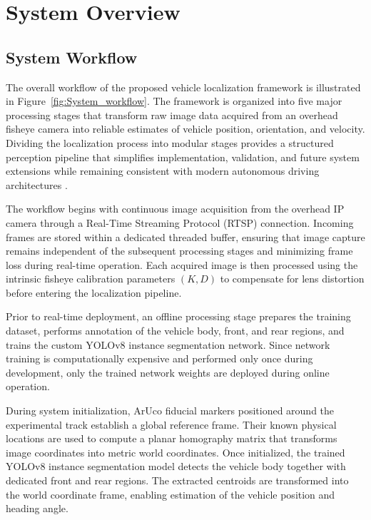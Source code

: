 \chapter{System Overview}

\section{System Workflow}

The overall workflow of the proposed vehicle localization framework is illustrated in Figure~\ref{fig:System_workflow}. The framework is organized into five major processing stages that transform raw image data acquired from an overhead fisheye camera into reliable estimates of vehicle position, orientation, and velocity. Dividing the localization process into modular stages provides a structured perception pipeline that simplifies implementation, validation, and future system extensions while remaining consistent with modern autonomous driving architectures \cite{grigorescu2020survey}.%

The workflow begins with continuous image acquisition from the overhead IP camera through a Real-Time Streaming Protocol (RTSP) connection. Incoming frames are stored within a dedicated threaded buffer, ensuring that image capture remains independent of the subsequent processing stages and minimizing frame loss during real-time operation. Each acquired image is then processed using the intrinsic fisheye calibration parameters $(K,D)$ to compensate for lens distortion before entering the localization pipeline.

Prior to real-time deployment, an offline processing stage prepares the training dataset, performs annotation of the vehicle body, front, and rear regions, and trains the custom YOLOv8 instance segmentation network. Since network training is computationally expensive and performed only once during development, only the trained network weights are deployed during online operation.%

During system initialization, ArUco fiducial markers positioned around the experimental track establish a global reference frame. Their known physical locations are used to compute a planar homography matrix that transforms image coordinates into metric world coordinates. Once initialized, the trained YOLOv8 instance segmentation model detects the vehicle body together with dedicated front and rear regions. The extracted centroids are transformed into the world coordinate frame, enabling estimation of the vehicle position and heading angle.


